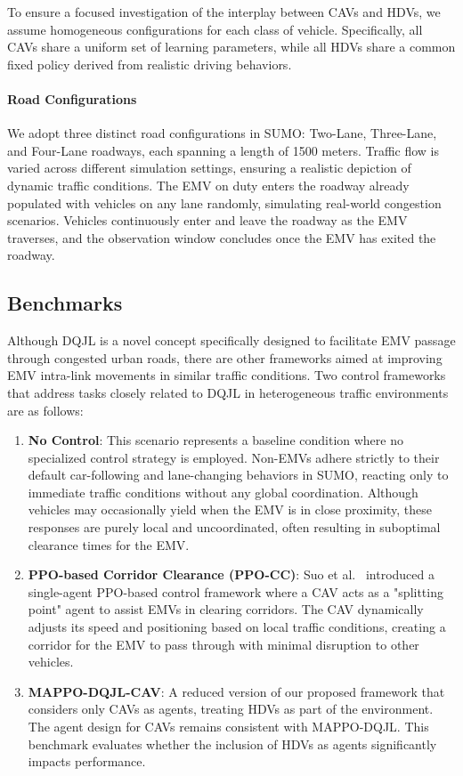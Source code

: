 To ensure a focused investigation of the interplay between CAVs and HDVs, we assume homogeneous configurations for each class of vehicle. Specifically, all CAVs share a uniform set of learning parameters, while all HDVs share a common fixed policy derived from realistic driving behaviors.

\paragraph{Road Configurations} We adopt three distinct road configurations in SUMO: Two-Lane, Three-Lane, and Four-Lane roadways, each spanning a length of 1500 meters. Traffic flow is varied across different simulation settings, ensuring a realistic depiction of dynamic traffic conditions. The EMV on duty enters the roadway already populated with vehicles on any lane randomly, simulating real-world congestion scenarios. Vehicles continuously enter and leave the roadway as the EMV traverses, and the observation window concludes once the EMV has exited the roadway.

\subsection{Benchmarks}
\label{subsec:benchmarks}
Although DQJL is a novel concept specifically designed to facilitate EMV passage through congested urban roads, there are other frameworks aimed at improving EMV intra-link movements in similar traffic conditions. Two control frameworks that address tasks closely related to DQJL in heterogeneous traffic environments are as follows:

\begin{enumerate}
    \item \textbf{No Control}: This scenario represents a baseline condition where no specialized control strategy is employed. Non-EMVs adhere strictly to their default car-following and lane-changing behaviors in SUMO, reacting only to immediate traffic conditions without any global coordination. Although vehicles may occasionally yield when the EMV is in close proximity, these responses are purely local and uncoordinated, often resulting in suboptimal clearance times for the EMV.

    \item \textbf{PPO-based Corridor Clearance (PPO-CC)}: Suo et al.~\cite{suo2024model} introduced a single-agent PPO-based control framework where a CAV acts as a "splitting point" agent to assist EMVs in clearing corridors. The CAV dynamically adjusts its speed and positioning based on local traffic conditions, creating a corridor for the EMV to pass through with minimal disruption to other vehicles. 

    \item \textbf{MAPPO-DQJL-CAV}: A reduced version of our proposed framework that considers only CAVs as agents, treating HDVs as part of the environment. The agent design for CAVs remains consistent with MAPPO-DQJL. This benchmark evaluates whether the inclusion of HDVs as agents significantly impacts performance.
\end{enumerate} 


